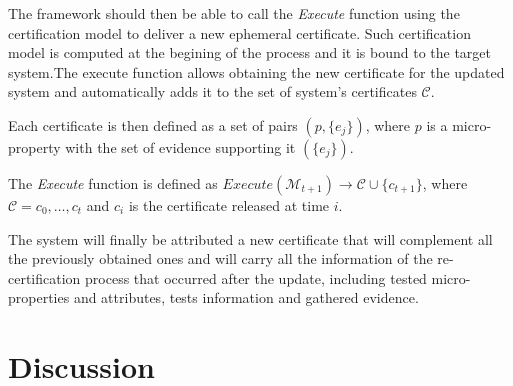 The framework should then be able to call the \textit{Execute} function using the certification model to deliver a new ephemeral certificate. Such certification model is computed at the begining of the process and it is bound to the target system.The execute function allows obtaining the new certificate for the updated system and automatically adds it to the set of system's certificates \(\mathcal{C}\).

 \begin{defn}
 Each certificate is then defined as a set of pairs \( (p, \{e_j\}) \), where \(p\) is a micro-property with the set of evidence supporting it \( (\{e_j\}) \).
 \end{defn}
 
\begin{defn}
The \textit{Execute} function is defined as \( Execute(\mathcal{M}_{t+1}) \rightarrow \mathcal{C} \cup \{c_{t+1}\} \), where \( \mathcal{C} = {c_0, \dots , c_t} \) and \(c_i\) is the certificate released at time \(i\).
\end{defn}
 

 
 The system will finally be attributed a new certificate that will complement all the previously obtained ones and will carry all the information of the re-certification process that occurred after the update, including tested micro-properties and attributes, tests information and gathered evidence.



\section{Discussion}

